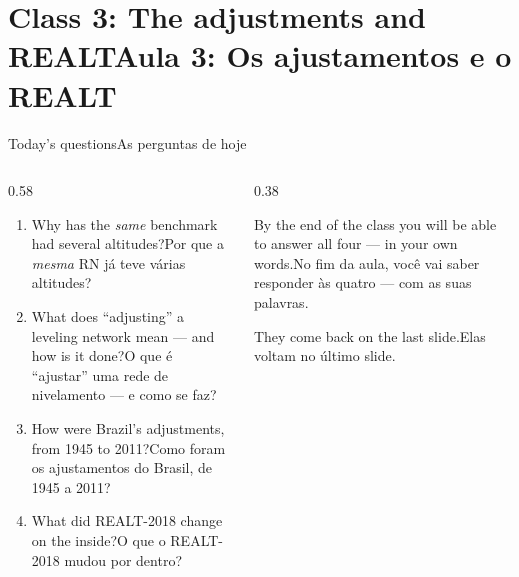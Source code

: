 \documentclass[aspectratio=169,11pt]{beamer}
\newcommand{\tr}[2]{\ifEN#2\else#1\fi}
\begin{document}
\section{\tr{Aula 3: Os ajustamentos e o REALT}{Class 3: The adjustments and REALT}}

\begin{frame}{\tr{As perguntas de hoje}{Today's questions}}
  \begin{columns}[T]
    \begin{column}{0.58\textwidth}
      \begin{enumerate}
        \setlength{\itemsep}{8pt}
        \item \tr{Por que a \emph{mesma} RN já teve várias altitudes?}{Why has the \emph{same}
              benchmark had several altitudes?}
        \item \tr{O que é ``ajustar'' uma rede de nivelamento --- e como se faz?}{What does
              ``adjusting'' a leveling network mean --- and how is it done?}
        \item \tr{Como foram os ajustamentos do Brasil, de 1945 a 2011?}{How were Brazil's
              adjustments, from 1945 to 2011?}
        \item \tr{O que o REALT-2018 mudou por dentro?}{What did REALT-2018 change on the
              inside?}
      \end{enumerate}
    \end{column}
    \begin{column}{0.38\textwidth}
      \begin{ideia}[title={\tr{Combinado}{Deal}}]
        \tr{No fim da aula, você vai saber responder às quatro --- com as suas
        palavras.}{By the end of the class you will be able to answer all four --- in your own
        words.}
        \medskip

        \tr{Elas voltam no último slide.}{They come back on the last slide.}
      \end{ideia}
    \end{column}
  \end{columns}
\end{frame}
\end{document}
